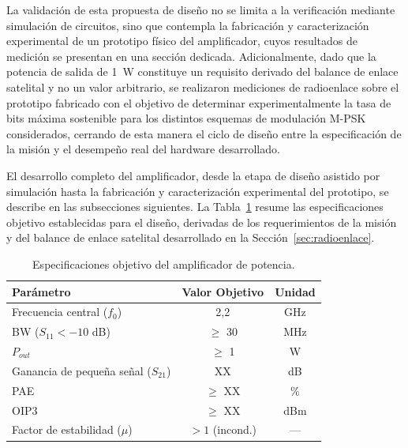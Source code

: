 La validación de esta propuesta de diseño no se limita a la verificación mediante simulación de circuitos, sino que contempla la fabricación y caracterización experimental de un prototipo físico del amplificador, cuyos resultados de medición se presentan en una sección dedicada. Adicionalmente, dado que la potencia de salida de 1~W constituye un requisito derivado del balance de enlace satelital y no un valor arbitrario, se realizaron mediciones de radioenlace sobre el prototipo fabricado con el objetivo de determinar experimentalmente la tasa de bits máxima sostenible para los distintos esquemas de modulación M-PSK considerados, cerrando de esta manera el ciclo de diseño entre la especificación de la misión y el desempeño real del hardware desarrollado.

El desarrollo completo del amplificador, desde la etapa de diseño asistido por simulación hasta la fabricación y caracterización experimental del prototipo, se describe en las subsecciones siguientes. La Tabla~\ref{tab:objetivos_diseno} resume las especificaciones objetivo establecidas para el diseño, derivadas de los requerimientos de la misión y del balance de enlace satelital desarrollado en la Sección~\ref{sec:radioenlace}.

\begin{table}[H]
    \centering
    \caption{Especificaciones objetivo del amplificador de potencia.}
    \label{tab:objetivos_diseno}
    \begin{tabular}{lcc}
        \hline\hline
        \textbf{Parámetro}                   & \textbf{Valor Objetivo} & \textbf{Unidad} \\
        \hline
        Frecuencia central ($f_0$)           & 2,2                     & GHz             \\
        BW ($S_{11} < -10$ dB)               & $\ge$ 30                & MHz             \\
        $P_{out}$                            & $\ge$ 1                 & W               \\
        Ganancia de pequeña señal ($S_{21}$) & XX                      & dB              \\
        PAE                                  & $\ge$ XX                & \%              \\
        OIP3                                 & $\ge$ XX                & dBm             \\
        Factor de estabilidad ($\mu$)        & $> 1$ (incond.)         & ---             \\
        \hline\hline
    \end{tabular}
\end{table}

